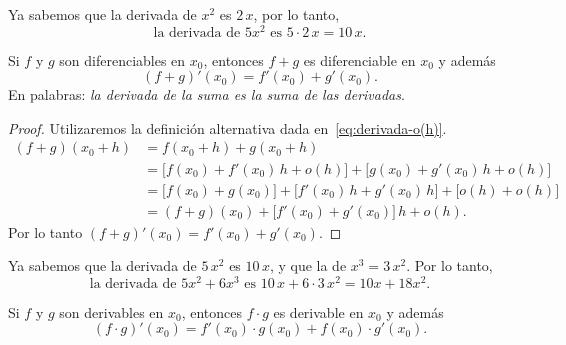 \begin{example}
    Ya sabemos que la derivada de $x^2$ es $2\, x$, por lo tanto, 
    \[
    \text{la derivada de $5 x^2$ es  $5 \cdot 2 \, x = 10\,  x$.}
    \]
\end{example}

\begin{proposition}
    Si $f$ y $g$ son diferenciables en $x_0$, entonces $f+g$ es diferenciable en $x_0$ y además
    \[
    (f+g)'(x_0) = f'(x_0)+g'(x_0).
    \]
    En palabras: \emph{la derivada de la suma es la suma de las derivadas}.
\end{proposition}

\begin{proof}
Utilizaremos la definición alternativa dada en~\eqref{eq:derivada-o(h)}.
\begin{align*}
    (f+g)(x_0+h) 
    &= f(x_0+h)+g(x_0+h)
    \\
    &= \big[f(x_0)+f'(x_0)\, h + o(h)\big]
    + \big[g(x_0)+g'(x_0)\, h + o(h)\big]
    \\
    &= \big[f(x_0)+g(x_0)\big] +
    \big[f'(x_0)\, h + g'(x_0)\, h\big] 
    + \big[o(h)+ o(h)\big]
    \\
    &= (f+g)(x_0) +
    \big[f'(x_0)+ g'(x_0)\big] \, h
    + o(h).
\end{align*}
Por lo tanto $(f+g)'(x_0) = f'(x_0)+g'(x_0)$.
\end{proof}

\begin{example}
    Ya sabemos que la derivada de $5 \,x^2$ es $10\,x$, y que la de $x^3 = 3\, x^2$.
    Por lo tanto, 
    \[
    \text{la derivada de $5 x^2 + 6 x^3$ es $10 \, x + 6 \cdot 3 \, x^2 = 10 x + 18 x^2$.}
    \]
\end{example}

\begin{proposition}
    Si $f$ y $g$ son derivables en $x_0$, entonces $f\cdot g$ es derivable en $x_0$ y además
    \[
    (f\cdot g)'(x_0) = f'(x_0)\cdot g(x_0)+f(x_0)\cdot g'(x_0).
    \]
\end{proposition}

